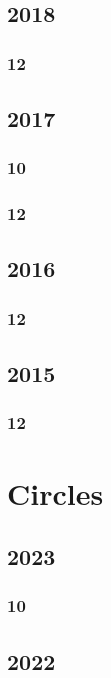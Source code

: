 \documentclass[11pt]{book}
\begin{document}
\section{2018}
\subsection{12}
  
 

\section{2017}
\subsection{10}

\subsection{12}






\section{2016}
\subsection{12}


\section{2015}
\subsection{12}




\chapter{Circles}
\section{2023}
\subsection{10}

\section{2022}
\end{document}
